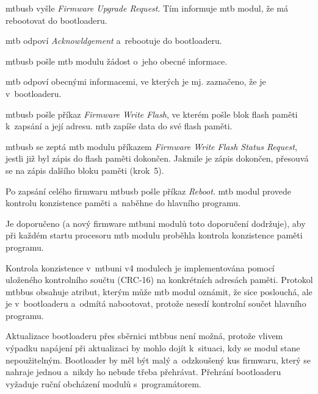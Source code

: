 \begin{compactenum}
\item \gls{mtbusb} vyšle \textit{Firmware Upgrade Request}. Tím informuje \gls{mtb}
	modul, že má rebootovat do bootloaderu.
\item \gls{mtb} odpoví \textit{Acknowldgement} a~rebootuje do bootloaderu.
\item \gls{mtbusb} pošle \gls{mtb} modulu žádost o~jeho obecné informace.
\item \gls{mtb} odpoví obecnými informacemi, ve kterých je mj. zaznačeno,
	že je v~bootloaderu.
\item \gls{mtbusb} pošle příkaz \textit{Firmware Write Flash}, ve kterém pošle
	blok flash paměti k~zapsání a její adresu. \gls{mtb} zapíše data do své flash
	paměti.
\item \gls{mtbusb} se zeptá \gls{mtb} modulu příkazem \textit{Firmware Write
	Flash Status Request}, jestli již byl zápis do flash paměti dokončen.
	Jakmile je zápis dokončen, přesouvá se na zápis dalšího bloku paměti (krok~5).
\item Po zapsání celého firmwaru \gls{mtbusb} pošle příkaz \textit{Reboot}.
	\gls{mtb} modul provede kontrolu konzistence paměti a~naběhne do hlavního
	programu.
\end{compactenum}

Je doporučeno (a nový firmware \gls{mtbuni} modulů toto doporučení dodržuje),
aby při každém startu procesoru \gls{mtb} modulu proběhla kontrola konzistence
paměti programu.

Kontrola konzistence v~\gls{mtbuni} v4 modulech je implementována pomocí
uloženého kontrolního součtu (CRC-16) na konkrétních adresách paměti.
Protokol \gls{mtbbus} obsahuje atribut, kterým může \gls{mtb} modul oznámit, že
sice poslouchá, ale je v~bootloaderu a~odmítá nabootovat, protože nesedí
kontrolní součet hlavního programu.

Aktualizace bootloaderu přes sběrnici \gls{mtbbus} není možná, protože vlivem
výpadku napájení při aktualizaci by mohlo dojít k~situaci, kdy se modul stane
nepoužitelným. Bootloader by měl být malý a~odzkoušený kus firmwaru, který se
nahraje jednou a~nikdy ho nebude třeba přehrávat. Přehrání bootloaderu vyžaduje
ruční obcházení modulů s~programátorem.
